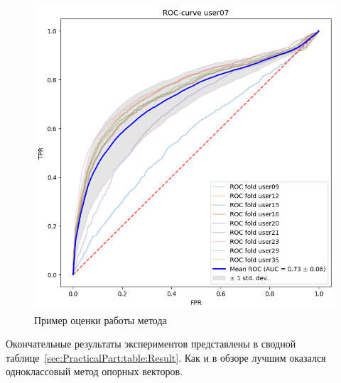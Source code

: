 \documentclass[12pt]{article}
\begin{document}
    \begin{figure}[h!]
        \centering
        \includegraphics[width=0.59\linewidth]{ROC_curve.png}
        \caption{Пример оценки работы метода}
        \label{sec:PracticalPart:fig:ROC_curve}
    \end{figure}
 
    \par Окончательные результаты экспериментов представлены в сводной таблице~\ref{sec:PracticalPart:table:Result}. Как и в обзоре лучшим оказался одноклассовый метод опорных векторов.
\end{document}
